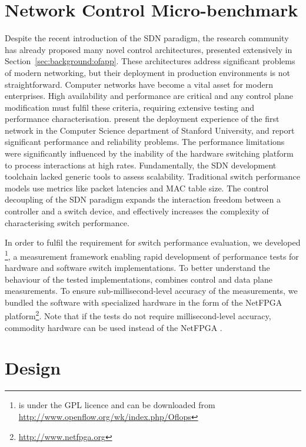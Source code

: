 \section{Network Control Micro-benchmark} \label{sec:oflops-intro}

Despite the recent introduction of the SDN paradigm, the research community has
already proposed many novel control architectures, presented
extensively in Section~\ref{sec:background:ofapp}. These architectures address
significant problems of modern networking, but their deployment in production
environments is not straightforward.  Computer networks have become a vital asset
for modern enterprises.  High availability and performance are critical and any
control plane modification must fulfil these criteria, requiring extensive
testing and performance characterisation.   present the
deployment experience of the first \of network in the Computer
Science department of Stanford University, and report significant performance and
reliability problems.  The performance limitations were significantly
influenced by the inability of the hardware switching platform to process \of
interactions at high rates.  Fundamentally, the SDN development toolchain lacked
generic tools to assess \of scalability.  Traditional switch performance models
use metrics like packet latencies and MAC table size. The control decoupling of
the SDN paradigm expands the interaction freedom between a controller and a
switch device, and effectively increases the complexity of characterising switch
performance. 

In order to fulfil the requirement for \of switch performance evaluation, we
developed \oflops\footnote{\oflops is under the GPL licence and can be
  downloaded from \url{http://www.openflow.org/wk/index.php/Oflops}}, a
measurement framework enabling rapid development of performance tests for
hardware and software \of switch implementations. To better understand the
behaviour of the tested \of implementations, \oflops combines
\of control and data plane measurements. To ensure
sub-millisecond-level accuracy of the measurements, we bundled the \oflops
software with specialized hardware in the form of the NetFPGA
platform\footnote{\url{http://www.netfpga.org}}.  Note that if the tests do not
require millisecond-level accuracy, commodity hardware can be used instead of
the NetFPGA .

\section{\oflops Design}\label{sec:oflops-design}


